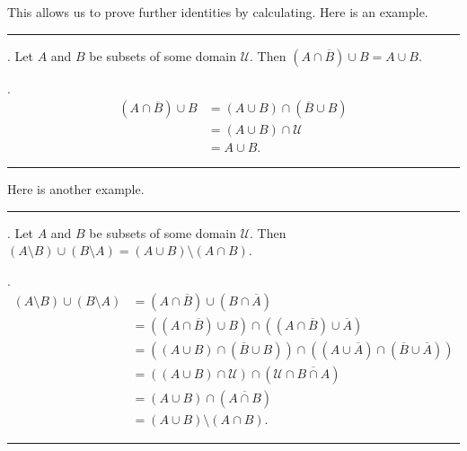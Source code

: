 \documentclass[letterpaper,10pt,english]{sphinxmanual}
\begin{document}
\sphinxAtStartPar
This allows us to prove further identities by calculating. Here is an example.


\bigskip\hrule\bigskip


\sphinxAtStartPar
{}. Let \(A\) and \(B\) be subsets of some domain \(\mathcal U\). Then \((A \cap \overline B) \cup B = A \cup B\).

\sphinxAtStartPar
{}.
\begin{equation*}
\begin{split}(A \cap \overline B) \cup B & = (A \cup B) \cap (\overline B \cup B)
\\
& = (A \cup B) \cap \mathcal U \\
& = A \cup B.\end{split}
\end{equation*}

\bigskip\hrule\bigskip


\sphinxAtStartPar
Here is another example.


\bigskip\hrule\bigskip


\sphinxAtStartPar
{}. Let \(A\) and \(B\) be subsets of some domain \(\mathcal U\). Then \((A \setminus B) \cup (B \setminus A) = (A \cup B) \setminus (A \cap B)\).

\sphinxAtStartPar
{}.
\begin{equation*}
\begin{split}(A \setminus B) \cup (B \setminus A) & = (A \cap \overline B) \cup (B \cap \overline A) \\
& = ((A \cap \overline B) \cup B) \cap ((A \cap \overline B) \cup \overline A) \\
& = ((A \cup B) \cap (\overline B \cup B)) \cap ((A \cup \overline A) \cap (\overline B \cup \overline A)) \\
& = ((A \cup B) \cap \mathcal U) \cap (\mathcal U \cap \overline{B \cap A}) \\
& = (A \cup B) \cap (\overline{A \cap B}) \\
& = (A \cup B) \setminus (A \cap B).\end{split}
\end{equation*}

\bigskip\hrule\bigskip
\end{document}
